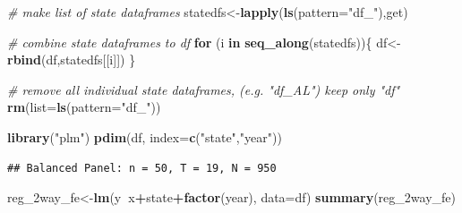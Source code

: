 \documentclass[]{book}
\newenvironment{Shaded}{\begin{snugshade}}{\end{snugshade}}
\newcommand{\KeywordTok}[1]{\textcolor[rgb]{0.13,0.29,0.53}{\textbf{#1}}}
\newcommand{\DataTypeTok}[1]{\textcolor[rgb]{0.13,0.29,0.53}{#1}}
\newcommand{\StringTok}[1]{\textcolor[rgb]{0.31,0.60,0.02}{#1}}
\newcommand{\CommentTok}[1]{\textcolor[rgb]{0.56,0.35,0.01}{\textit{#1}}}
\newcommand{\ControlFlowTok}[1]{\textcolor[rgb]{0.13,0.29,0.53}{\textbf{#1}}}
\newcommand{\OperatorTok}[1]{\textcolor[rgb]{0.81,0.36,0.00}{\textbf{#1}}}
\newcommand{\NormalTok}[1]{#1}
\theoremstyle{definition}
\theoremstyle{definition}
\theoremstyle{definition}
\theoremstyle{remark}
\begin{document}
\begin{Shaded}
\begin{Highlighting}[]
\CommentTok{# make list of state dataframes}
\NormalTok{statedfs<-}\KeywordTok{lapply}\NormalTok{(}\KeywordTok{ls}\NormalTok{(}\DataTypeTok{pattern=}\StringTok{"df_"}\NormalTok{),get)}

\CommentTok{# combine state dataframes to df }
\ControlFlowTok{for}\NormalTok{ (i }\ControlFlowTok{in} \KeywordTok{seq_along}\NormalTok{(statedfs))\{}
\NormalTok{  df<-}\KeywordTok{rbind}\NormalTok{(df,statedfs[[i]])}
\NormalTok{\}}

\CommentTok{# remove all individual state dataframes, (e.g. "df_AL") keep only "df"}
\KeywordTok{rm}\NormalTok{(}\DataTypeTok{list=}\KeywordTok{ls}\NormalTok{(}\DataTypeTok{pattern=}\StringTok{"df_"}\NormalTok{))}
\end{Highlighting}
\end{Shaded}

\begin{Shaded}
\begin{Highlighting}[]
\KeywordTok{library}\NormalTok{(}\StringTok{"plm"}\NormalTok{)}
\KeywordTok{pdim}\NormalTok{(df, }\DataTypeTok{index=}\KeywordTok{c}\NormalTok{(}\StringTok{"state"}\NormalTok{,}\StringTok{"year"}\NormalTok{))}
\end{Highlighting}
\end{Shaded}

\begin{verbatim}
## Balanced Panel: n = 50, T = 19, N = 950
\end{verbatim}

\begin{Shaded}
\begin{Highlighting}[]
\NormalTok{reg_2way_fe<-}\KeywordTok{lm}\NormalTok{(y}\OperatorTok{~}\NormalTok{x}\OperatorTok{+}\NormalTok{state}\OperatorTok{+}\KeywordTok{factor}\NormalTok{(year), }\DataTypeTok{data=}\NormalTok{df)}
\KeywordTok{summary}\NormalTok{(reg_2way_fe)}
\end{Highlighting}
\end{Shaded}
\end{document}
